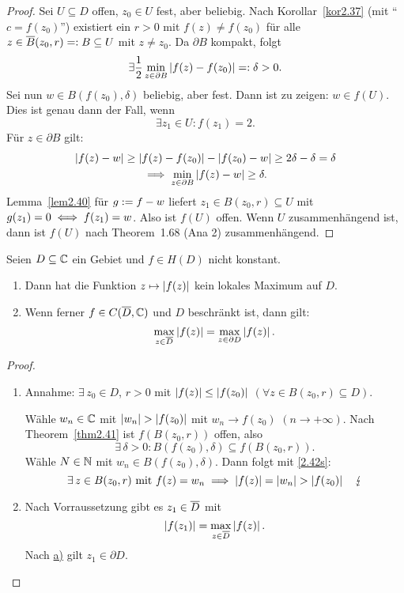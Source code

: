 \documentclass[a4paper,twoside,DIV15,BCOR12mm]{scrbook}
\begin{document}
\begin{proof} Sei $U\subseteq D$ offen, $z_0\in U$ fest, aber 
beliebig. Nach Korollar~\ref{kor2.37} (mit ``$c=f(z_0)$'') existiert 
ein $r>0$ mit $f(z)\neq f(z_0)$ für alle $z\in\overline{B}(z_0,r)=: B
\subseteq U$ mit $z\neq z_0$. Da $\partial B$ kompakt, folgt
\[\exists\frac{1}{2}\min_{z\in\partial B}\left\lvert f(z)-f(z_0)\right\lvert=:\delta >0.\]
Sei nun $w\in B(f(z_0),\delta)$ beliebig, aber fest. Dann ist zu 
zeigen: $w\in f(U)$. Dies ist genau dann der Fall, wenn
\[\exists z_1\in U: f(z_1)=2.\]
Für $z\in\partial B$ gilt:
\begin{gather*}\left\lvert f(z)-w\right\lvert\geq\left\lvert f(z)-f(z_0)\right\lvert-\left\lvert f(z_0)-w\right\lvert\geq 
2\delta - \delta = \delta\\
\implies \min_{z\in\partial B}\left\lvert f(z)-w\right\lvert\geq\delta.\end{gather*}
Lemma~\ref{lem2.40} für $g:= f-w$ liefert $z_1\in B(z_0,r)
\subseteq U$ mit $g(z_1)=0\iff f(z_1)=w$. Also ist $f(U)$ offen. 
Wenn $U$ zusammenhängend ist, dann ist $f(U)$ nach Theorem~1.68 (Ana 2) zusammenhängend.
\end{proof}

\begin{thm}[Maximumsprinzip]\label{thm2.42}
Seien $D\subseteq\mathbb{C}$ ein Gebiet und $f\in H(D)$ nicht konstant.
\begin{enumerate}
\item\label{thm2.42a} Dann hat die Funktion $z\mapsto\left\lvert f(z)\right\lvert$ kein lokales Maximum auf $D$.
\item\label{thm2.42b} Wenn ferner $f\in C(\overline{D},\mathbb{C})$ und $D$ beschränkt ist, dann gilt:
\[\max_{z\in\overline{D}}\left\lvert f(z)\right\lvert=\max_{z\in\partial D}\left\lvert f(z)\right\lvert.\]
\end{enumerate}
\end{thm}

\begin{proof}\begin{enumerate}
\item Annahme: $\exists\, z_0\in D$, $r>0$ mit $\left\lvert f(z)\right\lvert\leq\left\lvert f(z_0)\right\lvert$ $(\forall z\in B(z_0,r)\subseteq D)$.

Wähle $w_n\in\mathbb{C}$ mit $\left\lvert w_n\right\lvert>\left\lvert f(z_0)\right\lvert$ mit $w_n\to f(z_0)$ $(n\to+\infty)$. Nach Theorem~\ref{thm2.41} ist $f(B(z_0,r))$ offen, also
\[\label{2.42s}\exists\,\delta>0: B(f(z_0),\delta)\subseteq f(B(z_0,r)).\tag{$*$}\]
Wähle $N\in\mathbb{N}$ mit $w_n\in B(f(z_0),\delta)$. Dann folgt mit \eqref{2.42s}:
\[\exists\, z\in B(z_0,r)\text{ mit }f(z)=w_n\implies\left\lvert f(z)\right\lvert=\left\lvert w_n\right\lvert>\left\lvert f(z_0)\right\lvert\quad\lightning\]

\item Nach Vorraussetzung gibt es $z_1\in\overline{D}$ mit
\[\left\lvert f(z_1)\right\lvert = \max_{z\in\overline{D}}\left\lvert f(z)\right\lvert.\]
Nach \hyperref[thm2.42a]{a)} gilt $z_1\in\partial D$.\qedhere
\end{enumerate}
\end{proof}
\end{document}
